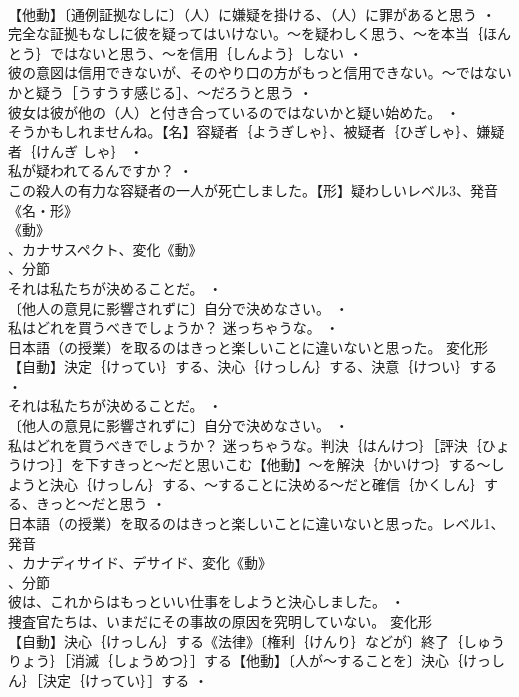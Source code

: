 \documentclass[8pt]{extreport}
\begin{document}
\begin{CJK}{UTF8}{min}
\\	【他動】〔通例証拠なしに〕（人）に嫌疑を掛ける、（人）に罪があると思う ・
\\	完全な証拠もなしに彼を疑ってはいけない。～を疑わしく思う、～を本当｛ほんとう｝ではないと思う、～を信用｛しんよう｝しない ・
\\	彼の意図は信用できないが、そのやり口の方がもっと信用できない。～ではないかと疑う［うすうす感じる］、～だろうと思う ・
\\	彼女は彼が他の（人）と付き合っているのではないかと疑い始めた。 ・
\\	そうかもしれませんね。【名】容疑者｛ようぎしゃ｝、被疑者｛ひぎしゃ｝、嫌疑者｛けんぎ しゃ｝ ・
\\	私が疑われてるんですか？ ・
\\	この殺人の有力な容疑者の一人が死亡しました。【形】疑わしいレベル3、発音《名・形》
\\	《動》
\\	、カナサスペクト、変化《動》
\\	、分節
\\	それは私たちが決めることだ。 ・
\\	〔他人の意見に影響されずに〕自分で決めなさい。 ・
\\	私はどれを買うべきでしょうか？ 迷っちゃうな。 ・
\\	日本語（の授業）を取るのはきっと楽しいことに違いないと思った。	変化形 
\\	【自動】決定｛けってい｝する、決心｛けっしん｝する、決意｛けつい｝する ・
\\	それは私たちが決めることだ。 ・
\\	〔他人の意見に影響されずに〕自分で決めなさい。 ・
\\	私はどれを買うべきでしょうか？ 迷っちゃうな。判決｛はんけつ｝［評決｛ひょうけつ｝］を下すきっと～だと思いこむ【他動】～を解決｛かいけつ｝する～しようと決心｛けっしん｝する、～することに決める～だと確信｛かくしん｝する、きっと～だと思う ・
\\	日本語（の授業）を取るのはきっと楽しいことに違いないと思った。レベル1、発音
\\	、カナディサイド、デサイド、変化《動》
\\	、分節
\\	彼は、これからはもっといい仕事をしようと決心しました。 ・
\\	捜査官たちは、いまだにその事故の原因を究明していない。	変化形 
\\	【自動】決心｛けっしん｝する《法律》〔権利｛けんり｝などが〕終了｛しゅうりょう｝［消滅｛しょうめつ｝］する【他動】〔人が～することを〕決心｛けっしん｝［決定｛けってい｝］する ・

\end{CJK}
\end{document}
